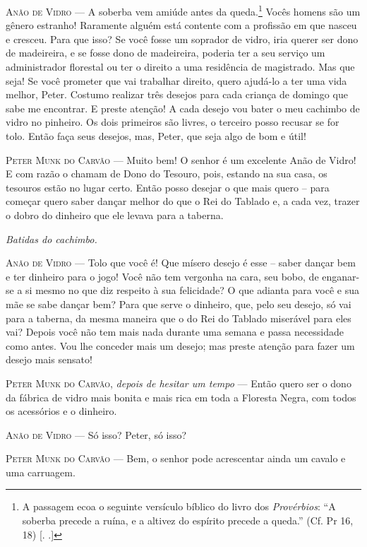 \begin{myparindent}{0pt}
\begin{Parskip}
\textsc{Anão de Vidro} --- A soberba vem amiúde antes da queda.\footnote{A
  passagem ecoa o seguinte versículo bíblico do livro dos
  \emph{Provérbios}: ``A soberba precede a ruína, e a altivez do
  espírito precede a queda.'' (Cf. Pr 16, 18) [. .]} Vocês
homens são um gênero estranho! Raramente alguém está contente com a
profissão em que nasceu e cresceu. Para que isso? Se você fosse um
soprador de vidro, iria querer ser dono de madeireira, e se fosse dono
de madeireira, poderia ter a seu serviço um administrador florestal ou
ter o direito a uma residência de magistrado. Mas que seja! Se você
prometer que vai trabalhar direito, quero ajudá-lo a ter uma vida
melhor, Peter. Costumo realizar três desejos para cada criança de
domingo que sabe me encontrar. E preste atenção! A cada desejo vou bater
o meu cachimbo de vidro no pinheiro. Os dois primeiros são livres, o
terceiro posso recusar se for tolo. Então faça seus desejos, mas, Peter,
que seja algo de bom e útil!

\textsc{Peter Munk do Carvão} --- Muito bem! O senhor é um excelente Anão de
Vidro! E com razão o chamam de Dono do Tesouro, pois, estando na sua
casa, os tesouros estão no lugar certo. Então posso desejar o que mais
quero -- para começar quero saber dançar melhor do que o Rei do Tablado
e, a cada vez, trazer o dobro do dinheiro que ele levava para a taberna.

\emph{Batidas do cachimbo.}

\textsc{Anão de Vidro} --- Tolo que você é! Que mísero desejo é esse -- saber
dançar bem e ter dinheiro para o jogo! Você não tem vergonha na cara,
seu bobo, de enganar-se a si mesmo no que diz respeito à sua felicidade?
O que adianta para você e sua mãe se sabe dançar bem? Para que serve o
dinheiro, que, pelo seu desejo, só vai para a taberna, da mesma maneira
que o do Rei do Tablado miserável para eles vai? Depois você não tem
mais nada durante uma semana e passa necessidade como antes. Vou lhe
conceder mais um desejo; mas preste atenção para fazer um desejo mais
sensato!

\textsc{Peter Munk do Carvão}, \emph{depois de hesitar um tempo} --- Então quero
ser o dono da fábrica de vidro mais bonita e mais rica em toda a
Floresta Negra, com todos os acessórios e o dinheiro.

\textsc{Anão de Vidro} --- Só isso? Peter, só isso?

\textsc{Peter Munk do Carvão} --- Bem, o senhor pode acrescentar ainda um cavalo e
uma carruagem.


\end{Parskip}
\end{myparindent}
